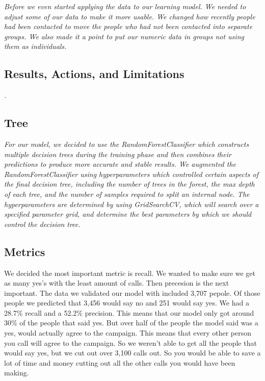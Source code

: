 \documentclass[
  letterpaper,
  DIV=11,
  numbers=noendperiod]{scrartcl}
\begin{document}
\emph{Before we even started applying the data to our learning model. We
needed to adjust some of our data to make it more usable. We changed how
recently people had been contacted to move the people who had not been
contacted into separate groups. We also made it a point to put our
numeric data in groups not using them as individuals.}

\hypertarget{results-actions-and-limitations}{%
\subsection{Results, Actions, and
Limitations}\label{results-actions-and-limitations}}

\emph{.}

\hypertarget{tree}{%
\subsection{Tree}\label{tree}}

\emph{For our model, we decided to use the RandomForestClassifier which
constructs multiple decision trees during the training phase and then
combines their predictions to produce more accurate and stable results.
We augmented the RandomForestClassifier using hyperparameters which
controlled certain aspects of the final decision tree, including the
number of trees in the forest, the max depth of each tree, and the
number of samples required to split an internal node. The
hyperparameters are determined by using GridSearchCV, which will search
over a specified parameter grid, and determine the best parameters by
which we should control the decision tree.}

\hypertarget{metrics}{%
\subsection{Metrics}\label{metrics}}

We decided the most important metric is recall. We wanted to make sure
we get as many yes's with the least amount of calls. Then precesion is
the next important. The data we validated our model with included 3,707
pepole. Of those people we predicted that 3,456 would say no and 251
would say yes. We had a 28.7\% recall and a 52.2\% precision. This means
that our model only got around 30\% of the people that said yes. But
over half of the people the model said was a yes, would actually agree
to the campaign. This means that every other person you call will agree
to the campaign. So we weren't able to get all the people that would say
yes, but we cut out over 3,100 calls out. So you would be able to save a
lot of time and money cutting out all the other calls you would have
been making.
\end{document}
